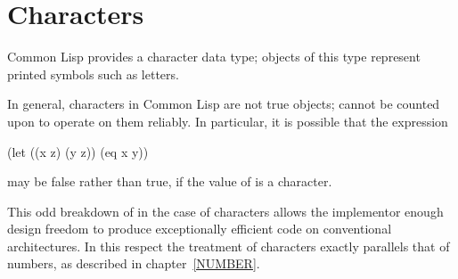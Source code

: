 
\clearpage\def\pagestatus{FINAL PROOF}

\ifx \rulang\Undef

\chapter{Characters}

Common Lisp provides a character data type; objects of this type
represent printed symbols such as letters.

In general, characters in Common Lisp are not true objects;  cannot
be counted upon to operate on them reliably.  In particular,
it is possible that the expression
\begin{lisp}
(let ((x z) (y z)) (eq x y))
\end{lisp}
may be false rather than true, if the value of  is a character.

\beforenoterule
\begin{rationale}
This odd breakdown of  in the case of characters
allows the implementor enough design freedom to produce exceptionally
efficient code on conventional architectures.  In this respect the
treatment of characters exactly parallels that of numbers, as described
in chapter~\ref{NUMBER}.
\end{rationale}
\afternoterule


